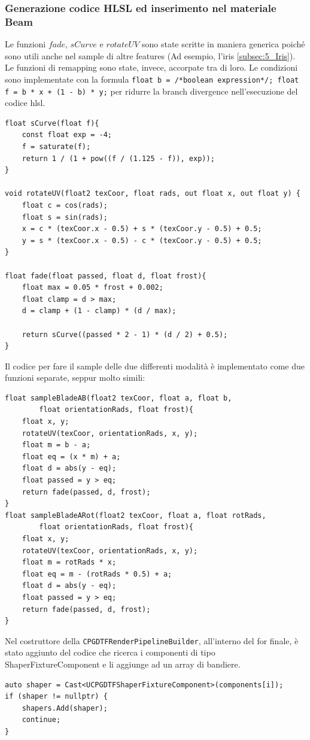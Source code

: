 \documentclass[main.tex]{subfiles}
\begin{document}
\subsubsection{Generazione codice HLSL ed inserimento nel materiale Beam}\label{subsec:5_1_ShaperHlsl}
\lstset{language=glsl}
Le funzioni $fade$, $sCurve$ e $rotateUV$ sono state scritte in maniera generica poiché sono utili anche nel sample di altre features (Ad esempio, l'iris \ref{subsec:5_Iris}). Le funzioni di remapping sono state, invece, accorpate tra di loro. Le condizioni sono implementate con la formula \lstinline{float b = /*boolean expression*/; float f = b * x + (1 - b) * y;} per ridurre la branch divergence nell'esecuzione del codice hlsl.
\begin{lstlisting}
float sCurve(float f){
	const float exp = -4;
	f = saturate(f);
	return 1 / (1 + pow((f / (1.125 - f)), exp));
}

void rotateUV(float2 texCoor, float rads, out float x, out float y) {
	float c = cos(rads);
	float s = sin(rads);
	x = c * (texCoor.x - 0.5) + s * (texCoor.y - 0.5) + 0.5;
	y = s * (texCoor.x - 0.5) - c * (texCoor.y - 0.5) + 0.5;
}

float fade(float passed, float d, float frost){
	float max = 0.05 * frost + 0.002;
	float clamp = d > max;
	d = clamp + (1 - clamp) * (d / max);

	return sCurve((passed * 2 - 1) * (d / 2) + 0.5);
}
\end{lstlisting}

Il codice per fare il sample delle due differenti modalità è implementato come due funzioni separate, seppur molto simili:
\begin{lstlisting}
float sampleBladeAB(float2 texCoor, float a, float b,
		float orientationRads, float frost){
	float x, y;
	rotateUV(texCoor, orientationRads, x, y);
	float m = b - a;
	float eq = (x * m) + a;
	float d = abs(y - eq);
	float passed = y > eq;
	return fade(passed, d, frost);
}
float sampleBladeARot(float2 texCoor, float a, float rotRads,
		float orientationRads, float frost){
	float x, y;
	rotateUV(texCoor, orientationRads, x, y);
	float m = rotRads * x;
	float eq = m - (rotRads * 0.5) + a;
	float d = abs(y - eq);
	float passed = y > eq;
	return fade(passed, d, frost);
}
\end{lstlisting}


Nel costruttore della \lstinline{CPGDTFRenderPipelineBuilder}, all'interno del for finale, è stato aggiunto del codice che ricerca i componenti di tipo ShaperFixtureComponent e li aggiunge ad un array di bandiere.
\lstset{language=UEcpp}
\begin{lstlisting}
auto shaper = Cast<UCPGDTFShaperFixtureComponent>(components[i]);
if (shaper != nullptr) {
    shapers.Add(shaper);
    continue;
}
\end{lstlisting}
\end{document}
